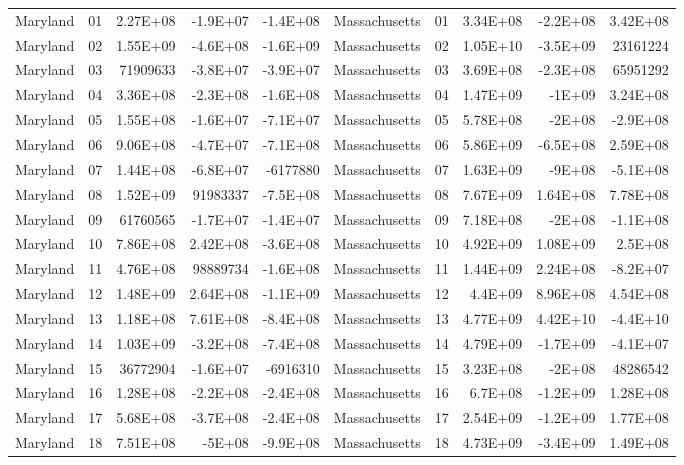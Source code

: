 \begin{landscape}
\begin{singlespace}
\begin{longtable}{lrrrr|lrrrr}
		Maryland &  01  & 2.27E+08 & -1.9E+07 & -1.4E+08 & Massachusetts &  01  & 3.34E+08 & -2.2E+08 & 3.42E+08 \\
		Maryland &  02  & 1.55E+09 & -4.6E+08 & -1.6E+09 & Massachusetts &  02  & 1.05E+10 & -3.5E+09 & 23161224 \\
		Maryland &  03  & 71909633 & -3.8E+07 & -3.9E+07 & Massachusetts &  03  & 3.69E+08 & -2.3E+08 & 65951292 \\
		Maryland &  04  & 3.36E+08 & -2.3E+08 & -1.6E+08 & Massachusetts &  04  & 1.47E+09 & -1E+09 & 3.24E+08 \\
		Maryland &  05  & 1.55E+08 & -1.6E+07 & -7.1E+07 & Massachusetts &  05  & 5.78E+08 & -2E+08 & -2.9E+08 \\
		Maryland &  06  & 9.06E+08 & -4.7E+07 & -7.1E+08 & Massachusetts &  06  & 5.86E+09 & -6.5E+08 & 2.59E+08 \\
		Maryland &  07  & 1.44E+08 & -6.8E+07 & -6177880 & Massachusetts &  07  & 1.63E+09 & -9E+08 & -5.1E+08 \\
		Maryland &  08  & 1.52E+09 & 91983337 & -7.5E+08 & Massachusetts &  08  & 7.67E+09 & 1.64E+08 & 7.78E+08 \\
		Maryland &  09  & 61760565 & -1.7E+07 & -1.4E+07 & Massachusetts &  09  & 7.18E+08 & -2E+08 & -1.1E+08 \\
		Maryland &  10 & 7.86E+08 & 2.42E+08 & -3.6E+08 & Massachusetts &  10 & 4.92E+09 & 1.08E+09 & 2.5E+08 \\
		Maryland &  11 & 4.76E+08 & 98889734 & -1.6E+08 & Massachusetts &  11 & 1.44E+09 & 2.24E+08 & -8.2E+07 \\
		Maryland &  12 & 1.48E+09 & 2.64E+08 & -1.1E+09 & Massachusetts &  12 & 4.4E+09 & 8.96E+08 & 4.54E+08 \\
		Maryland &  13 & 1.18E+08 & 7.61E+08 & -8.4E+08 & Massachusetts &  13 & 4.77E+09 & 4.42E+10 & -4.4E+10 \\
		Maryland &  14 & 1.03E+09 & -3.2E+08 & -7.4E+08 & Massachusetts &  14 & 4.79E+09 & -1.7E+09 & -4.1E+07 \\
		Maryland &  15 & 36772904 & -1.6E+07 & -6916310 & Massachusetts &  15 & 3.23E+08 & -2E+08 & 48286542 \\
		Maryland &  16 & 1.28E+08 & -2.2E+08 & -2.4E+08 & Massachusetts &  16 & 6.7E+08 & -1.2E+09 & 1.28E+08 \\
		Maryland &  17 & 5.68E+08 & -3.7E+08 & -2.4E+08 & Massachusetts &  17 & 2.54E+09 & -1.2E+09 & 1.77E+08 \\
		Maryland &  18 & 7.51E+08 & -5E+08 & -9.9E+08 & Massachusetts &  18 & 4.73E+09 & -3.4E+09 & 1.49E+08 \\

\end{longtable}
\end{singlespace}
\end{landscape}
